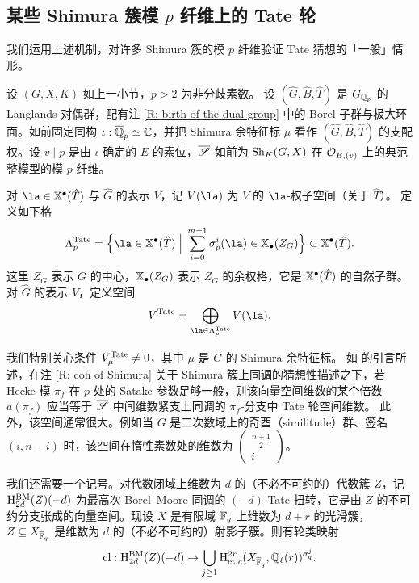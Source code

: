 \subsection{某些 Shimura 簇模 $p$ 纤维上的 Tate 轮}
我们运用上述机制，对许多 Shimura 簇的模 $p$ 纤维验证 Tate 猜想的「一般」情形。

设 $(G,X,K)$ 如上一小节，$p>2$ 为非分歧素数。
设 $(\hat G, \hat B,\hat T)$ 是 $G_{{\mathbb Q}_p}$ 的 Langlands 对偶群，配有注 \ref{R: birth of the dual group} 中的 Borel 子群与极大环面。如前固定同构 $\iota: \overline{{\mathbb Q}}_p\simeq {\mathbb C}$，并把 Shimura 余特征标 $\mu$ 看作 $(\hat G,\hat B,\hat T)$ 的支配权。设 $v\mid p$ 是由 $\iota$ 确定的 $E$ 的素位，$\overline{\mathscr{S}}$ 如前为 $\operatorname{Sh}_K(G,X)$ 在 ${\mathcal O}_{E,(v)}$ 上的典范整模型的模 $p$ 纤维。

对 $\la\in\xch(\hat T)$ 与 $\hat G$ 的表示 $V$，记 $V(\la)$ 为 $V$ 的 $\la$-权子空间（关于 $\hat T$）。
定义如下格
\[\Lambda^\Tate_p=\Big\{\la\in \xch(\hat T)\; \Big|\; \sum_{i=0}^{m-1} \sigma_p^i(\la)\in \xcoch(Z_G)\Big\}\subset \xch(\hat T).\]
这里 $Z_G$ 表示 $G$ 的中心，$\mathbb{X}_\bullet(Z_G)$ 表示 $Z_G$ 的余权格，它是 $\mathbb{X}^\bullet(\hat T)$ 的自然子群。对 $\hat G$ 的表示 $V$，定义空间
\[V^\Tate=\bigoplus_{\la\in\Lambda^\Tate_p} V(\la).\]

我们特别关心条件 $V^{\mathrm{Tate}}_\mu\neq 0$，其中 $\mu$ 是 $G$ 的 Shimura 余特征标。
如 \cite{XZ} 的引言所述，在注 \ref{R: coh of Shimura} 关于 Shimura 簇上同调的猜想性描述之下，若 Hecke 模 $\pi_f$ 在 $p$ 处的 Satake 参数足够一般，则该向量空间维数的某个倍数 $a(\pi_f)$ 应当等于 $\overline{\mathscr{S}}$ 中间维数紧支上同调的 $\pi_f$-分支中 Tate 轮空间维数。
此外，该空间通常很大。例如当 $G$ 是二次数域上的奇酉（similitude）群、签名 $(i,n-i)$ 时，该空间在惰性素数处的维数为 $\begin{pmatrix}\frac{n+1}{2}\\ i\end{pmatrix}$。

我们还需要一个记号。对代数闭域上维数为 $d$ 的（不必不可约的）代数簇 $Z$，记 ${\rm H}^{\rm BM}_{2d}(Z)(-d)$ 为最高次 Borel–Moore 同调的 $(-d)$-Tate 扭转，它是由 $Z$ 的不可约分支张成的向量空间。现设 $X$ 是有限域 $\mathbb{F}_q$ 上维数为 $d+r$ 的光滑簇，$Z \subseteq X_{\overline {\mathbb{F}}_q}$ 是维数为 $d$ 的（不必不可约的）射影子簇。则有轮类映射
\[\operatorname{cl}: {\rm H}^{\rm BM}_{2d}(Z)(-d)\to \bigcup_{j\geq 1}{\rm H}_{\mathrm{et},c}^{2r}(X_{\overline {\mathbb{F}}_q}, {\mathbb Q}_\ell(r))^{\sigma_q^j}.\]

